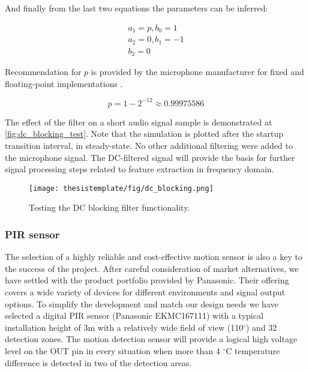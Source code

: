 And finally from the last two equations the parameters can be inferred:


\begin{equation}
\label{eq:a_zero}
\begin{aligned}
a_1=p, b_0 = 1 \\
 a_2=0, b_1 = -1\\
b_2 = 0
\end{aligned}
\end{equation}

Recommendation for $p$ is provided by the microphone manufacturer for fixed and floating-point implementations \cite{knowles_dc_filter}. 

\begin{equation*}
    p = 1-2^{-12} \approx 0.99975586
\end{equation*}


The effect of the filter on a short audio signal sample is demonstrated at \autoref{fig:dc_blocking_test}. Note that the simulation is plotted after the startup transition interval, in steady-state. No other additional filtering were added to the microphone signal. The DC-filtered signal will provide the basis for further signal processing steps related to feature extraction in frequency domain.

\begin{figure}[h!]
  \begin{center}
    \texttt{[image: thesistemplate/fig/dc\_blocking.png]}
    \caption{Testing the DC blocking filter functionality.}
    \label{fig:dc_blocking_test}
  \end{center}
\end{figure}



\subsubsection{PIR sensor}

The selection of a highly reliable and cost-effective motion sensor is also a key to the success of the project. After careful consideration of market alternatives, we have settled with the product portfolio provided by Panasonic. Their offering covers a wide variety of devices for different environments and signal output options. To simplify the development and match our design needs we have selected a digital PIR sensor (Panasonic EKMC167111) with a typical installation height of 3m with a relatively wide field of view (110$^{\circ}$) and 32 detection zones. The motion detection sensor will provide a logical high voltage level on the OUT pin in every situation when more than 4 $^{\circ}$C temperature difference is detected in two of the detection areas.

